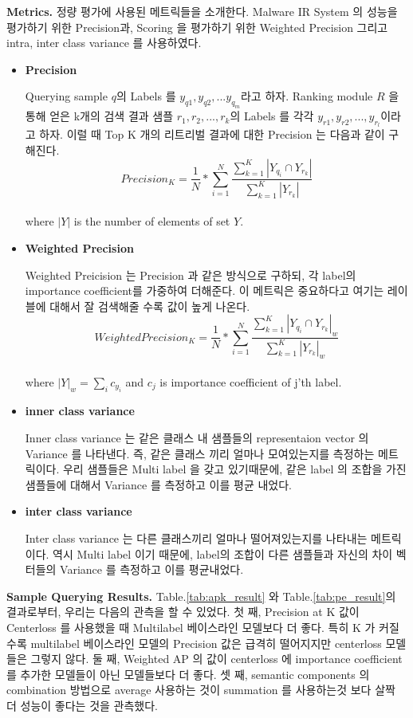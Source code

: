 \textbf{Metrics. } 정량 평가에 사용된 메트릭들을 소개한다. Malware IR System 의 성능을 평가하기 위한 Precision과, Scoring 을 평가하기 위한 Weighted Precision 그리고 intra, inter class variance 를 사용하였다. 
\begin{itemize}
	\item{ \textbf{Precision} 


	Querying sample $q$의 Labels 를 $y_{q1}, y_{q2}, ... y_{q_m}$라고 하자. Ranking module $R$ 을 통해 얻은 k개의 검색 결과 샘플 $r_1, r_2, ..., r_k$의 Labels 를 각각 $y_{r1}, y_{r2}, ..., y_{r_l}$이라고 하자. 이럴 때 Top K 개의 리트리벌 결과에 대한 Precision 는 다음과 같이 구해진다. 
	\[
	Precision_{K} = \frac{1}{N} *\sum_{i=1}^{N}{ \frac{ \sum_{k=1}^{K}{|Y_{q_i} \cap Y_{r_k}|}}{  \sum_{k=1}^{K}{ |Y_{r_k}| }  }}
	\]\\
	where $|Y|$ is the number of elements of set $Y$.
	}
	\item{ \textbf{Weighted Precision} 
	
	Weighted Preicision 는 Precision 과 같은 방식으로 구하되, 각 label의 importance coefficient를 가중하여 더해준다. 이 메트릭은 중요하다고 여기는 레이블에 대해서 잘 검색해줄 수록 값이 높게 나온다. 
	\[
	WeightedPrecision_{K} = \frac{1}{N} *\sum_{i=1}^{N}{ \frac{ \sum_{k=1}^{K}{|Y_{q_i} \cap Y_{r_k}|_w}}{  \sum_{k=1}^{K}{ |Y_{r_k}|_w }  }}
	\]\\
	where $|Y|_w = \sum_i{c_{y_i}}$ and $c_j$ is importance coefficient of j'th label.
	}
	\item{ \textbf{inner class variance} 
	
	Inner class variance 는 같은 클래스 내 샘플들의 representaion vector 의 Variance 를 나타낸다. 즉, 같은 클래스 끼리 얼마나 모여있는지를 측정하는 메트릭이다. 우리 샘플들은 Multi label 을 갖고 있기때문에, 같은 label 의 조합을 가진 샘플들에 대해서 Variance 를 측정하고 이를 평균 내었다.   
	}
	\item{ \textbf{inter class variance} 
	
	Inter class variance 는 다른 클래스끼리 얼마나 떨어져있는지를 나타내는 메트릭이다. 역시 Multi label 이기 때문에, label의 조합이 다른 샘플들과 자신의 차이 벡터들의 Variance 를 측정하고 이를 평균내었다. 
	}
\end{itemize}



\textbf{Sample Querying Results. }
Table.\ref{tab:apk_result} 와 Table.\ref{tab:pe_result}의 결과로부터, 우리는 다음의 관측을 할 수 있었다. 
첫 째, Precision at K 값이 Centerloss 를 사용했을 때 Multilabel 베이스라인 모델보다 더 좋다. 특히 K 가 커질수록 multilabel 베이스라인 모델의 Precision 값은 급격히 떨어지지만 centerloss 모델들은 그렇지 않다. 
둘 째, Weighted AP 의 값이 centerloss 에 importance coefficient 를 추가한 모델들이 아닌 모델들보다 더 좋다. 
셋 째, semantic components 의 combination 방법으로 average 사용하는 것이 summation 를 사용하는것 보다 살짝 더 성능이 좋다는 것을 관측했다.

